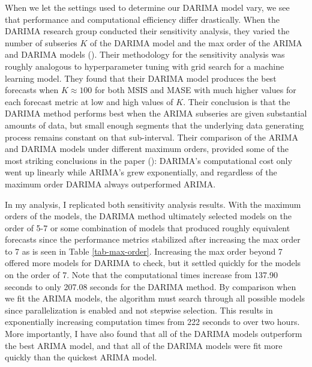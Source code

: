 \documentclass[
]{article}
\begin{document}
When we let the settings used to determine our DARIMA model vary, we see that performance and computational efficiency differ drastically. When the DARIMA research group conducted their sensitivity analysis, they varied the number of subseries $K$ of the DARIMA model and the max order of the ARIMA and DARIMA models (\cite[p.30]{wang_distributed_2020}). Their methodology for the sensitivity analysis was roughly analogous to hyperparameter tuning with grid search for a machine learning model. They found that their DARIMA model produces the best forecasts when $K \approx 100$ for both MSIS and MASE with much higher values for each forecast metric at low and high values of $K$. Their conclusion is that the DARIMA method performs best when the ARIMA subseries are given substantial amounts of data, but small enough segments that the underlying data generating process remains constant on that sub-interval. Their comparison of the ARIMA and DARIMA models under different maximum orders, provided some of the most striking conclusions in the paper (\cite[p.~31]{wang_distributed_2020}): DARIMA's computational cost only went up linearly while ARIMA's grew exponentially, and regardless of the maximum order DARIMA always outperformed ARIMA.

In my analysis, I replicated both sensitivity analysis results. With the maximum orders of the models, the DARIMA method ultimately selected models on the order of 5-7 or some combination of models that produced roughly equivalent forecasts since the performance metrics stabilized after increasing the max order to 7 as is seen in Table \ref{tab-max-order}. Increasing the max order beyond 7 offered more models for DARIMA to check, but it settled quickly for the models on the order of 7. Note that the computational times increase from 137.90 seconds to only 207.08 seconds for the DARIMA method. By comparison when we fit the ARIMA models, the algorithm must search through all possible models since parallelization is enabled and not stepwise selection. This results in exponentially increasing computation times from 222 seconds to over two hours. More importantly, I have also found that all of the DARIMA models outperform the best ARIMA model, and that all of the DARIMA models were fit more quickly than the quickest ARIMA model. 
\end{document}
